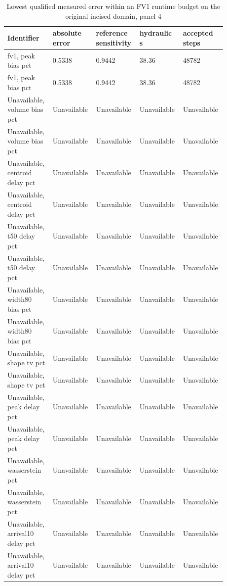 \begin{longtable}{p{0.1760\linewidth}p{0.1760\linewidth}p{0.1760\linewidth}p{0.1760\linewidth}p{0.1760\linewidth}}
\caption{Lowest qualified measured error within an FV1 runtime budget on the original incised domain, panel 4}\\
\hline
Identifier & absolute error & reference sensitivity & hydraulic s & accepted steps \\
\hline\endhead
fv1, peak bias pct & 0.5338 & 0.9442 & 38.36 & 48782 \\
fv1, peak bias pct & 0.5338 & 0.9442 & 38.36 & 48782 \\
Unavailable, volume bias pct & Unavailable & Unavailable & Unavailable & Unavailable \\
Unavailable, volume bias pct & Unavailable & Unavailable & Unavailable & Unavailable \\
Unavailable, centroid delay pct & Unavailable & Unavailable & Unavailable & Unavailable \\
Unavailable, centroid delay pct & Unavailable & Unavailable & Unavailable & Unavailable \\
Unavailable, t50 delay pct & Unavailable & Unavailable & Unavailable & Unavailable \\
Unavailable, t50 delay pct & Unavailable & Unavailable & Unavailable & Unavailable \\
Unavailable, width80 bias pct & Unavailable & Unavailable & Unavailable & Unavailable \\
Unavailable, width80 bias pct & Unavailable & Unavailable & Unavailable & Unavailable \\
Unavailable, shape tv pct & Unavailable & Unavailable & Unavailable & Unavailable \\
Unavailable, shape tv pct & Unavailable & Unavailable & Unavailable & Unavailable \\
Unavailable, peak delay pct & Unavailable & Unavailable & Unavailable & Unavailable \\
Unavailable, peak delay pct & Unavailable & Unavailable & Unavailable & Unavailable \\
Unavailable, wasserstein pct & Unavailable & Unavailable & Unavailable & Unavailable \\
Unavailable, wasserstein pct & Unavailable & Unavailable & Unavailable & Unavailable \\
Unavailable, arrival10 delay pct & Unavailable & Unavailable & Unavailable & Unavailable \\
Unavailable, arrival10 delay pct & Unavailable & Unavailable & Unavailable & Unavailable \\

\end{longtable}
